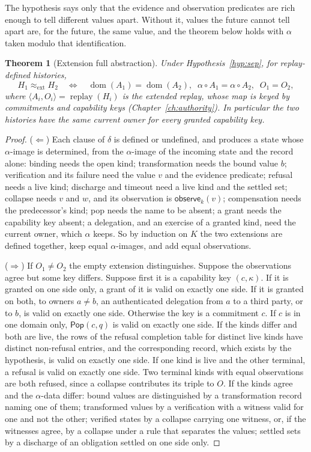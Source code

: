 \documentclass[11pt,openany]{book}
\newtheorem{theorem}{Theorem}[chapter]
\theoremstyle{remark}
\newcommand{\Pop}{\mathsf{Pop}}
\newcommand{\dom}{\operatorname{dom}}
\newcommand{\replay}{\operatorname{replay}}
\begin{document}
The hypothesis says only that the evidence and observation predicates are
rich enough to tell different values apart. Without it, values the
future cannot tell apart are, for the future, the same value, and the
theorem below holds with $\alpha$ taken modulo that identification.

\begin{theorem}[Extension full abstraction]\label{thm:ext}
Under Hypothesis~\ref{hyp:sep}, for replay-defined histories,
\[
H_1\approx_{\mathrm{ext}}H_2
\quad\Longleftrightarrow\quad
\dom(A_1)=\dom(A_2),\;\;\alpha\circ A_1=\alpha\circ A_2,\;\;O_1=O_2,
\]
where $\langle A_i,O_i\rangle=\replay(H_i)$ is the extended replay, whose
map is keyed by commitments and capability keys
(Chapter~\ref{ch:authority}). In particular the two histories have the
same current owner for every granted capability key.
\end{theorem}

\begin{proof}
($\Leftarrow$) Each clause of $\delta$ is defined or undefined, and
produces a state whose $\alpha$-image is determined, from the
$\alpha$-image of the incoming state and the record alone: binding needs
the open kind; transformation needs the bound value $b$; verification
and its failure need the value $v$ and the evidence predicate; refusal
needs a live kind; discharge and timeout need a live kind and the settled
set; collapse needs $v$ and $w$, and its observation is
$\mathsf{observe}_k(v)$; compensation needs the predecessor's kind; pop
needs the name to be absent; a grant needs the capability key absent; a
delegation, and an exercise of a granted kind, need the current owner,
which $\alpha$ keeps. So by induction on $K$ the two extensions are
defined together, keep equal $\alpha$-images, and add equal observations.

($\Rightarrow$) If $O_1\ne O_2$ the empty extension distinguishes. Suppose
the observations agree but some key differs. Suppose first it is a
capability key $(c,\kappa)$. If it is granted on one side only, a grant of
it is valid on exactly one side. If it is granted on both, to owners
$a\ne b$, an authenticated delegation from $a$ to a third party, or to $b$,
is valid on exactly one side. Otherwise the key is a commitment $c$. If
$c$ is in one domain only, $\Pop(c,q)$ is valid on exactly one side. If the kinds differ and
both are live, the rows of the refusal completion table for distinct live
kinds have distinct non-refusal entries, and the corresponding record,
which exists by the hypothesis, is valid on exactly one side. If one kind
is live and the other terminal, a refusal is valid on exactly one side.
Two terminal kinds with equal observations are both refused, since a
collapse contributes its triple to $O$. If the kinds agree and the
$\alpha$-data differ: bound values are distinguished by a transformation
record naming one of them; transformed values by a verification with a
witness valid for one and not the other; verified states by a collapse
carrying one witness, or, if the witnesses agree, by a collapse under a
rule that separates the values; settled sets by a discharge of an
obligation settled on one side only.
\end{proof}
\end{document}
